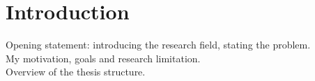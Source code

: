 \chapter*{Introduction}


Opening statement: introducing the research field, stating the problem.\\
My motivation, goals and research limitation.\\
Overview of the thesis structure.\\